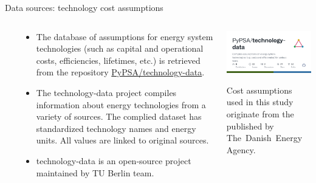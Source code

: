 \begin{frame}{Data sources: technology cost assumptions}
 
  \begin{columns}[T]\

  \begin{column}{8cm}
    {\small 
    \begin{itemize}
      \item The database of assumptions for energy system technologies (such as capital and operational costs, efficiencies, lifetimes, etc.) is retrieved from the repository \alert{\href{https://github.com/pypsa/technology-data}{PyPSA/technology-data}}. 
      
      \item The technology-data project compiles information about energy technologies from a variety of sources. The complied dataset has standardized technology names and energy units. All values are linked to original sources.

      \item  technology-data is an open-source project maintained by TU Berlin team. \\
      \faGithub~ \\
      \faBook~

    \end{itemize}}  
  \end{column}

  \begin{column}{7cm}
  \centering
  \includegraphics[width=7.2cm]{images/technology-data.png}
  \vspace{0.5cm}
  {\small
  \begin{flushright}
    Cost assumptions used in this study originate from the  published by The~Danish~Energy~Agency.
  \end{flushright}
  }
  \end{column}
  
  \end{columns}
\end{frame}



